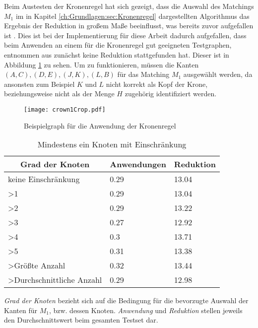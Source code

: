 Beim Austesten der Kronenregel hat sich gezeigt, dass die Auswahl des Matchings $M_{1}$ im in Kapitel \ref{ch:Grundlagen:sec:Kronenregel} dargestellten Algorithmus das Ergebnis der Reduktion in großem Maße beeinflusst, was bereits zuvor aufgefallen ist \cite{paper:7}. Dies ist bei der Implementierung für diese Arbeit dadurch aufgefallen, dass beim Anwenden an einem für die Kronenregel gut geeigneten Testgraphen, entnommen aus  zunächst keine Reduktion stattgefunden hat. Dieser ist in Abbildung \ref{fig:crown1} zu sehen. Um zu funktionieren, müssen die Kanten $(A,C), (D,E), (J,K), (L,B)$ für das Matching $M_{1}$ ausgewählt werden, da ansonsten zum Beispiel $K$ und $L$ nicht korrekt als Kopf der Krone, beziehungsweise nicht als der Menge $H$ zugehörig identifiziert werden.
\begin{figure}[htb]
\centering
  	{\texttt{[image: crown1Crop.pdf]}}
	\caption{Beispielgraph für die Anwendung der Kronenregel\label{fig:crown1}}
\centering
\end{figure}
\begin{table}[htb]
\caption{Mindestens ein Knoten mit Einschränkung\label{tab:degreeOR}}
\vspace*{1em}
\centering

\bgroup
\def\arraystretch{1.3}%

\begin{threeparttable}

\begin{tabular}[c]{lll}
	\hline
	\multicolumn{1}{c}{\textbf{Grad der Knoten}} & 
	\multicolumn{1}{c}{\textbf{Anwendungen}} & 
	\multicolumn{1}{c}{\textbf{Reduktion}} \\ 
	
	\hline

	keine Einschränkung&0.29&13.04\\
	>1&0.29 &13.04 \\
	>2&0.29 &13.22 \\
	>3& 0.27& 12.92 \\
	>4& 0.3& 13.71 \\
	>5& 0.31&13.38 \\
	>Größte Anzahl& 0.32&13.44 \\
	>Durchschnittliche Anzahl& 0.29&12.98 \\
	\hline
\end{tabular}
\begin{tablenotes}\footnotesize
\item \emph{Grad der Knoten} bezieht sich auf die Bedingung für die bevorzugte Auswahl der Kanten für $M_{1}$, bzw. dessen Knoten. \emph{Anwendung} und \emph{Reduktion} stellen jeweils den Durchschnittswert beim gesamten Testset dar.
\end{tablenotes}

\end{threeparttable}

\egroup

\end{table}


